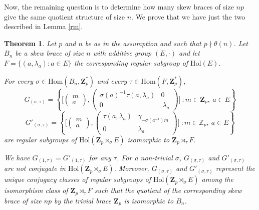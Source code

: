 \documentclass[12pt]{article}
\newtheorem{theorem}{Theorem}[section]
\theoremstyle{definition}
\newcommand{\Z}{\mathbf Z}
\newcommand{\Hol}{\mathrm{Hol}}
\newcommand{\Hom}{\mathrm{Hom}}
\begin{document}
Now, the remaining question is to determine how many skew braces of size $np$ give the same quotient structure of size $n$.
We prove that we have just the two described in Lemma \ref{rm}.
	
\begin{theorem}\label{2Gs}
Let $p$ and $n$ be as in the assumption and such that $p\nmid \theta(n)$. Let $B_n$ be a skew brace of size $n$ with additive group $(E,\cdot)$ and let
	$F=\{(a,\lambda_a): a\in E\}$ the corresponding regular subgroup of $\Hol(E)$.
		
	For every $\sigma\in\Hom(B_n,\Z_p^*)$ and every $\tau\in \Hom(F,\Z_p^*)$,
	$$
	G_{(\sigma,\tau)}=\left\{\Big[\begin{pmatrix}m\\a\end{pmatrix},
	\begin{pmatrix}\sigma(a)^{-1}\tau(a,\lambda_a) & 0\\0&\ \lambda_a\end{pmatrix}\Big]
		\ \colon 
		m\in\Z_p,\  a\in E
		\right\}
	$$
	$$G'_{(\sigma,\tau)}=\left\{\Big[\begin{pmatrix}m\\a\end{pmatrix},
		\begin{pmatrix}\tau(a,\lambda_a) & \gamma_{-\sigma(a^{-1})m}\\0&\lambda_a\end{pmatrix}\Big]
		\ \colon 
		m\in\mathbb Z_p,\  a\in E
		\right\}
	$$
	are regular subgroups of $\Hol(\Z_p\rtimes_{\sigma}E)$
	isomorphic to $\Z_p\rtimes_{\tau} F$.
		
	We have $G_{(1,\tau)}=G'_{(1,\tau)}$ for any $\tau$. For a
	non-trivial $\sigma$,
	$G_{(\sigma,\tau)}$ and $G'_{(\sigma,\tau)}$ are not conjugate in $\Hol(\Z_p\rtimes_{\sigma}E)$. Moreover, $G_{(\sigma,\tau)}$
	and $G'_{(\sigma,\tau)}$ represent the unique conjugacy classes of regular 
	subgroups of $\Hol(\Z_p\rtimes_{\sigma} E)$ among the isomorphism class of $\Z_p\rtimes_{\tau}F$ such that the quotient of the corresponding skew brace of size $np$ by the trivial brace $\Z_p$ is isomorphic to $B_n$.
\end{theorem}
	
\end{document}
